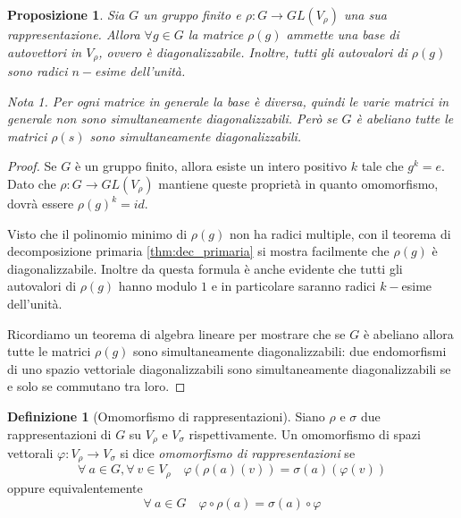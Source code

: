 \documentclass[11pt]{article}
\theoremstyle{plain}
\newtheorem{prop}[thm]{Proposizione}
\theoremstyle{definition}
\newtheorem{defn}{Definizione}[section]
\theoremstyle{remark}
\newtheorem*{note}{Nota}
\begin{document}
\begin{prop}
Sia $G$ un gruppo finito e $\rho: G \to GL(V_\rho)$ una sua rappresentazione. Allora $\forall g \in G$ la matrice $\rho(g)$ ammette una base di autovettori in $V_\rho$, ovvero è diagonalizzabile. Inoltre, tutti gli autovalori di $\rho(g)$ sono radici $n-$esime dell'unità.

\begin{note} Per ogni matrice in generale la base è diversa, quindi le varie matrici in generale \emph{non} sono simultaneamente diagonalizzabili.
Però se $G$ è abeliano tutte le matrici $\rho(s)$ sono simultaneamente diagonalizzabili. 
\end{note}
\label{prop:diagonalizzabilita rappresentazioni}
\end{prop}

\begin{proof} Se $G$ è un gruppo finito, allora esiste un intero positivo $k$ tale che $g^k = e$. Dato che $\rho:G\to GL(V_\rho)$ mantiene queste proprietà in quanto omomorfismo, dovrà essere $\rho(g)^k = id$.

Visto che il polinomio minimo di $\rho(g)$ non ha radici multiple, con il teorema di decomposizione primaria \eqref{thm:dec_primaria} si mostra facilmente che $\rho(g)$ è diagonalizzabile. Inoltre da questa formula è anche evidente che tutti gli autovalori di $\rho(g)$ hanno modulo $1$ e in particolare saranno radici $k-$esime dell'unità.

Ricordiamo un teorema di algebra lineare per mostrare che se $G$ è abeliano allora
tutte le matrici $\rho(g)$ sono simultaneamente diagonalizzabili:
due endomorfismi di uno spazio vettoriale diagonalizzabili sono simultaneamente diagonalizzabili se e solo se commutano tra loro.
\end{proof}




\begin{defn}[Omomorfismo di rappresentazioni]
Siano $\rho$ e $\sigma$ due rappresentazioni di $G$ su $V_{\rho}$ e $V_{\sigma}$ rispettivamente. Un omomorfismo di spazi vettorali $\varphi:V_{\rho}\to V_{\sigma}$ si dice \textit{omomorfismo di rappresentazioni} se
\[
	\forall\ a\in G, \forall\ v\in V_{\rho}\quad \varphi(\rho(a)(v)) = \sigma(a)(\varphi(v))
\]
oppure equivalentemente
\[
	\forall\ a\in G\quad \varphi\circ \rho(a) = \sigma(a)\circ \varphi
\]






\end{defn}
\end{document}
